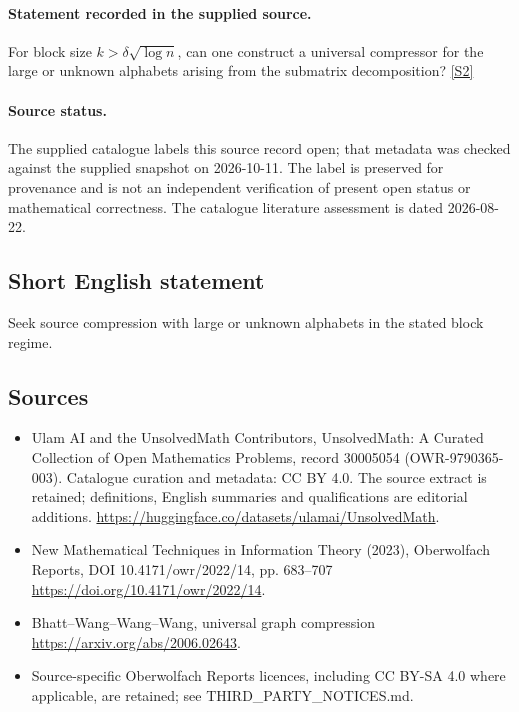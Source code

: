 \documentclass[11pt]{article}
\begin{document}
\paragraph{Statement recorded in the supplied source.}
For block size $k>\delta\sqrt{\log n}$, can one construct a universal compressor for the large or unknown alphabets arising from the submatrix decomposition? \href{https://doi.org/10.4171/owr/2022/14}{[S2]}
\paragraph{Source status.}
The supplied catalogue labels this source record open; that metadata was checked against the supplied snapshot on 2026-10-11. The label is preserved for provenance and is not an independent verification of present open status or mathematical correctness. The catalogue literature assessment is dated 2026-08-22.
\subsection{Short English statement}
Seek source compression with large or unknown alphabets in the stated block regime.
\subsection{Sources}
\begin{itemize}
\item[S1] Ulam AI and the UnsolvedMath Contributors, UnsolvedMath: A Curated Collection of Open Mathematics Problems, record 30005054 (OWR-9790365-003). Catalogue curation and metadata: CC BY 4.0. The source extract is retained; definitions, English summaries and qualifications are editorial additions.
\url{https://huggingface.co/datasets/ulamai/UnsolvedMath}.
\item[S2] New Mathematical Techniques in Information Theory (2023), Oberwolfach Reports, DOI 10.4171/owr/2022/14, pp. 683--707
\url{https://doi.org/10.4171/owr/2022/14}.
\item[S3] Bhatt--Wang--Wang--Wang, universal graph compression
\url{https://arxiv.org/abs/2006.02643}.
\item Source-specific Oberwolfach Reports licences, including CC BY-SA 4.0 where applicable, are retained; see THIRD\_PARTY\_NOTICES.md.
\end{itemize}
\end{document}
